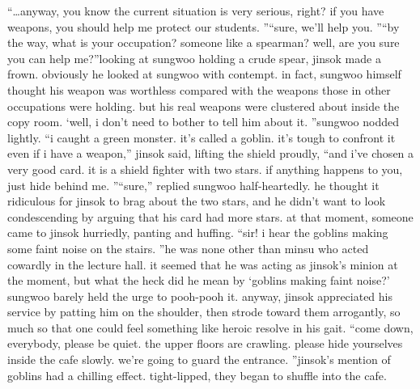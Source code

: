 “…anyway, you know the current situation is very serious, right? if you have weapons, you should help me protect our students.
”“sure, we’ll help you.
”“by the way, what is your occupation? someone like a spearman? well, are you sure you can help me?”looking at sungwoo holding a crude spear, jinsok made a frown.
 obviously he looked at sungwoo with contempt.
in fact, sungwoo himself thought his weapon was worthless compared with the weapons those in other occupations were holding.
 but his real weapons were clustered about inside the copy room.
‘well, i don’t need to bother to tell him about it.
”sungwoo nodded lightly.
“i caught a green monster.
 it’s called a goblin.
 it’s tough to confront it even if i have a weapon,” jinsok said, lifting the shield proudly, “and i’ve chosen a very good card.
 it is a shield fighter with two stars.
 if anything happens to you, just hide behind me.
”“sure,” replied sungwoo half-heartedly.
 he thought it ridiculous for jinsok to brag about the two stars, and he didn’t want to look condescending by arguing that his card had more stars.
at that moment, someone came to jinsok hurriedly, panting and huffing.
“sir! i hear the goblins making some faint noise on the stairs.
”he was none other than minsu who acted cowardly in the lecture hall.
 it seemed that he was acting as jinsok’s minion at the moment, but what the heck did he mean by ‘goblins making faint noise?’ sungwoo barely held the urge to pooh-pooh it.
anyway, jinsok appreciated his service by patting him on the shoulder, then strode toward them arrogantly, so much so that one could feel something like heroic resolve in his gait.
“come down, everybody, please be quiet.
 the upper floors are crawling.
 please hide yourselves inside the cafe slowly.
 we’re going to guard the entrance.
”jinsok’s mention of goblins had a chilling effect.
 tight-lipped, they began to shuffle into the cafe.

